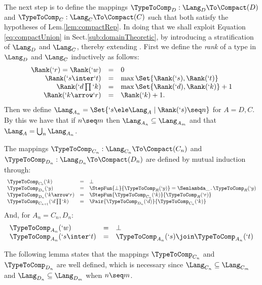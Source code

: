 \documentclass{CSML}
\begin{document}
The next step is to define the mappings $\TypeToComp_D:\Lang_D \To \Compact(D)$ and $\TypeToComp_C:\Lang_C \To \Compact(C)$ such that both satisfy the hypotheses of Lem.\skp\ref{lem:compactRep}. 
In doing that we shall exploit Equation \ref{eq:compactUnion} in Sect.\skp\ref{sub:domainTheoretic}, by introducing a stratification of $\Lang_D$ and $\Lang_C$, thereby extending \cite{Dezani-Honsell-Alessi'03}. 
First we define the \emph{rank} of a type in $\Lang_D$ and $\Lang_C$ inductively as follows:
%
 \[ \begin{array}{rcl}
 \Rank(`r) = \Rank(`w) &=& 0 \\
 \Rank(`s \inter `t) &=& \max \Set{\Rank(`s), \Rank(`t)} \\
 \Rank(`d\prod `k) &=& \max \Set{\Rank(`d), \Rank(`k)} + 1 \\
 \Rank(`k\arrow `r) &=&\Rank(`k) + 1.
 \end{array} \]
Then we define $\Lang_{A_n} = \Set{`s \ele \Lang_A \mid \Rank(`s) \seq n}$ for $A=D,C$. By this we have that if $n \seq m$ then $\Lang_{A_n} \subseteq \Lang_{A_m}$ and that $\Lang_A = \bigcup_n \Lang_{A_n}$.


 \begin{defi} \label{def:typesToComp}
The mappings $ \TypeToComp_{C_n}: \Lang_{C_n} \To \Compact(C_n)$ and
$ \TypeToComp_{D_n}: \Lang_{D_n} \To \Compact(D_n)$ are defined by mutual induction through:
%
 \[ \begin{array}{lcl}
 \TypeToComp_{C_0}(`k) &=& \bot \\
 \TypeToComp_{D_n}(`y) &=& \StepFun{\bot }{ \TypeToComp_R(`y)} = \Semlambda \_ \, . \, \TypeToComp_R(`y) \\
 \TypeToComp_{D_n}(`k\arrow `r) &=& \StepFun{\TypeToComp_{C_n}(`k) }{ \TypeToComp_R(`r)} \\
 \TypeToComp_{C_{n+1}}(`d\prod `k) &=& \Pair{\TypeToComp_{D_n}(`d) }{ \TypeToComp_{C_n}(`k)}
 \end{array} \]
And, for $A_n = C_n, D_n$:
%
 \[ \begin{array}{lll}
 \TypeToComp_{A_n}(`w) &=& \bot \\
 \TypeToComp_{A_n}(`s \inter`t) &=& \TypeToComp_{A_n}(`s) \join \TypeToComp_{A_n}(`t)
 \end{array} \]
 \end{defi}

The following lemma states that the mappings $\TypeToComp_{C_n}$ and $\TypeToComp_{D_n}$ are well defined, which is necessary since $\Lang_{C_n} \subseteq \Lang_{C_m}$ and $\Lang_{D_n} \subseteq \Lang_{D_m}$ when $n\seq m$.
\end{document}

